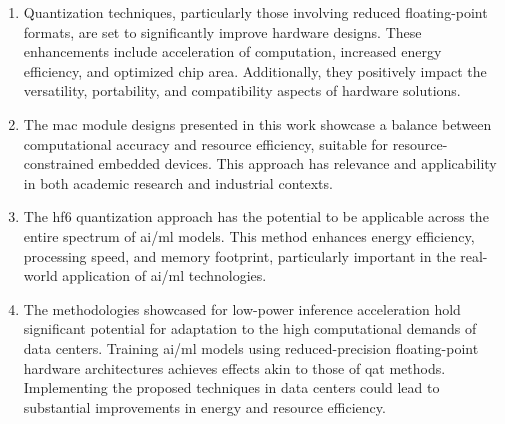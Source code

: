 \begin{enumerate}
	\item Quantization techniques, particularly those involving reduced floating-point formats, are set to significantly improve hardware designs. These enhancements include acceleration of computation, increased energy efficiency, and optimized chip area. Additionally, they positively impact the versatility, portability, and compatibility aspects of hardware solutions.
	
	\item The \gls{mac} module designs presented in this work showcase a balance between computational accuracy and resource efficiency, suitable for resource-constrained embedded devices. This approach has relevance and applicability in both academic research and industrial contexts.
	
	\item The \gls{hf6} quantization approach has the potential to be applicable across the entire spectrum of \gls{ai}/\gls{ml} models. This method enhances energy efficiency, processing speed, and memory footprint, particularly important in the real-world application of \gls{ai}/\gls{ml} technologies.
	
	\item The methodologies showcased for low-power inference acceleration hold significant potential for adaptation to the high computational demands of data centers. Training \gls{ai}/\gls{ml} models using reduced-precision floating-point hardware architectures achieves effects akin to those of \gls{qat} methods. Implementing the proposed techniques in data centers could lead to substantial improvements in energy and resource efficiency.
\end{enumerate}

